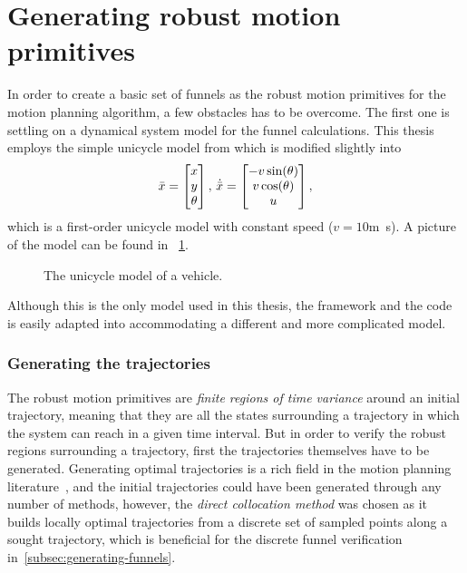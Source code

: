 \section{Generating robust motion primitives}
\label{sec:generating-robust-motion-primitives}

In order to create a basic set of funnels as the robust motion primitives for
the \rrtfunnel{} motion planning algorithm, a few obstacles has to be overcome.
The first one is settling on a dynamical system model for the funnel
calculations. This thesis employs the simple unicycle model from
\cite[LaValle.p~613]{Lav06} which is modified slightly into
\begin{equation}
  \label{eq:model-dynamics}
  \bar{x} =
  \begin{bmatrix}
    x \\ y \\ \theta \\
  \end{bmatrix}, \, \dot{\bar{x}} =
  \begin{bmatrix}
    -v \sin(\theta) \\
    v \cos(\theta) \\
    u \\
  \end{bmatrix},
\end{equation}
which is a first-order unicycle model with constant speed (\(v=10\)\si{m.s}). A
picture of the model can be found in ~\cref{fig:second-order-unicycle}.
\begin{figure}
  \caption{The unicycle model of a vehicle.}
  \label{fig:second-order-unicycle}
\end{figure}
Although this is the only model used in this thesis, the framework and the code
is easily adapted into accommodating a different and more complicated model.

\subsubsection{Generating the trajectories}
\label{subsec:generating-the-trajectories}

The robust motion primitives are \textit{finite regions of time variance} around
an initial trajectory, meaning that they are all the states surrounding a
trajectory in which the system can reach in a given time interval. But in order
to verify the robust regions surrounding a trajectory, first the trajectories
themselves have to be generated. Generating optimal trajectories is a rich field
in the motion planning literature~\cite{Betts_1998}, and the initial
trajectories could have been generated through any number of methods, however,
the \textit{direct collocation method} was chosen as it builds locally optimal
trajectories from a discrete set of sampled points along a sought trajectory,
which is beneficial for the discrete funnel verification
in~\cref{subsec:generating-funnels}.

